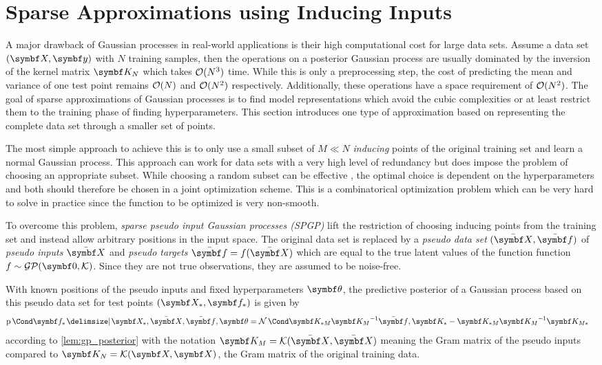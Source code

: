 \section{Sparse Approximations using Inducing Inputs}
A major drawback of Gaussian processes in real-world applications is their high computational cost for large data sets.
Assume a data set $(\mat{X}, \mat{y})$ with $N$ training samples, then the operations on a posterior Gaussian process are usually dominated by the inversion of the kernel matrix $\mat{K_N}$ which takes $\operatorname{\mathcal{O}}(N^3)$ time.
While this is only a preprocessing step, the cost of predicting the mean and variance of one test point remains $\operatorname{\mathcal{O}}(N)$ and $\operatorname{\mathcal{O}}(N^2)$ respectively.
Additionally, these operations have a space requirement of $\operatorname{\mathcal{O}}(N^2)$.
The goal of sparse approximations of Gaussian processes is to find model representations which avoid the cubic complexities or at least restrict them to the training phase of finding hyperparameters.
This section introduces one type of approximation based on representing the complete data set through a smaller set of points.

The most simple approach to achieve this is to only use a small subset of $M \ll N$ \emph{inducing} points of the original training set and learn a normal Gaussian process.
This approach can work for data sets with a very high level of redundancy but does impose the problem of choosing an appropriate subset.
While choosing a random subset can be effective \cite{snelson_flexible_2007}, the optimal choice is dependent on the hyperparameters and both should therefore be chosen in a joint optimization scheme.
This is a combinatorical optimization problem which can be very hard to solve in practice since the function to be optimized is very non-smooth.

To overcome this problem, \emph{sparse pseudo input Gaussian processes (SPGP)} \cite{snelson_flexible_2007} lift the restriction of choosing inducing points from the training set and instead allow arbitrary positions in the input space.
The original data set is replaced by a \emph{pseudo data set} $(\ps{\mat{X}}, \ps{\mat{f}})$ of \emph{pseudo inputs} $\ps{\mat{X}}$ and \emph{pseudo targets} $\ps{\mat{f}} = f(\ps{\mat{X}})$ which are equal to the true latent values of the function function $f \sim \GP(\mat{0}, \K)$.
Since they are not true observations, they are assumed to be noise-free.

With known positions of the pseudo inputs and fixed hyperparameters $\mat{\theta}$, the predictive posterior of a Gaussian process based on this pseudo data set for test points $(\mat{X_\ast}, \mat{f_\ast})$ is given by
\begin{align}
    \Prob{\mat{f_\ast} \given \mat{X_\ast}, \ps{\mat{X}}, \ps{\mat{f}}, \mat{\theta}} &= \Gaussian{\mat{K_{\ast M}}\mat{K_M}^{-1} \ps{\mat{f}}, \mat{K_\ast} - \mat{K_{\ast M}} \mat{K_M}^{-1} \mat{K_{M \ast}}}
\end{align}
according to \cref{lem:gp_posterior} with the notation $\mat{K_M} = \K(\ps{\mat{X}}, \ps{\mat{X}})$ meaning the Gram matrix of the pseudo inputs compared to $\mat{K_N} = \K(\mat{X}, \mat{X})$, the Gram matrix of the original training data.

